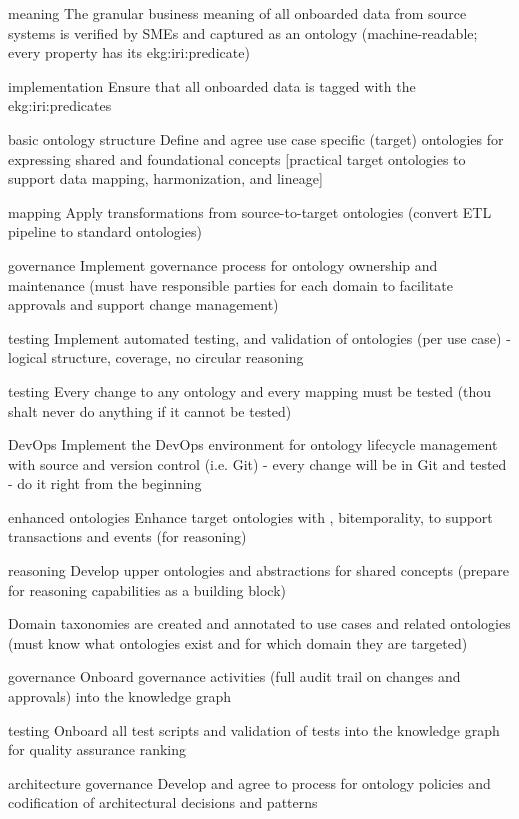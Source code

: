 \begin{scoring}

  \item [meaning] The granular business meaning of all onboarded data from source systems is verified by SMEs and
        captured as an ontology (machine-readable; every property has its \gls{ekg:iri:predicate})
  \item [implementation] Ensure that all onboarded data is tagged with the \glspl{ekg:iri:predicate}
  \item [basic ontology structure] Define and agree use case specific (target) ontologies for expressing shared and
        foundational concepts [practical target ontologies to support data mapping, harmonization, and lineage]
  \item [mapping] Apply transformations from source-to-target ontologies (convert ETL pipeline to standard ontologies)
  \item [governance] Implement governance process for ontology ownership and maintenance (must have responsible parties
        for each domain to facilitate approvals and support change management)
  \item [testing] Implement automated testing, and validation of ontologies (per use case) - logical structure, coverage,
        no circular reasoning
  \item [testing] Every change to any ontology and every mapping must be tested (thou shalt never do anything if it
        cannot be tested)
  \item [DevOps] Implement the DevOps environment for ontology lifecycle management with source and version control
        (i.e. Git) - every change will be in Git and tested - do it right from the beginning

\end{scoring}

\kgmmscoringlevelTwo

\begin{scoring}

  \item [enhanced ontologies] Enhance target ontologies with , \gls{bitemporality}, to support
        transactions and events (for reasoning)
  \item [reasoning] Develop upper ontologies and abstractions for shared concepts (prepare for reasoning capabilities
        as a building block)
  \item Domain taxonomies are created and annotated to use cases and related ontologies (must know what ontologies
        exist and for which domain they are targeted)
  \item [governance] Onboard governance activities (full audit trail on changes and approvals) into the knowledge graph
  \item [testing] Onboard all test scripts and validation of tests into the knowledge graph for quality assurance ranking
  \item [architecture governance] Develop and agree to process for ontology policies and codification of architectural
        decisions and patterns

\end{scoring}


